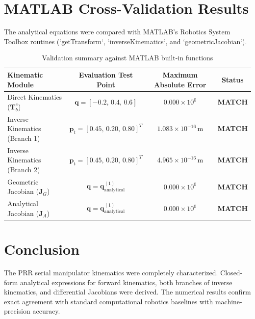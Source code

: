 \documentclass[11pt, a4paper]{article}
\begin{document}
\section{MATLAB Cross-Validation Results}
The analytical equations were compared with MATLAB's Robotics System Toolbox routines (`getTransform`, `inverseKinematics`, and `geometricJacobian`).

\begin{table}[htbp]
\centering
\caption{Validation summary against MATLAB built-in functions}
\label{tab:validation}
\begin{tabular}{lccc}
\toprule
\textbf{Kinematic Module} & \textbf{Evaluation Test Point} & \textbf{Maximum Absolute Error} & \textbf{Status} \\
\midrule
Direct Kinematics ($\mathbf{T}_b^e$) & $\mathbf{q} = [-0.2,\, 0.4,\, 0.6]$ & $0.000\times 10^0$ & \textbf{MATCH} \\
Inverse Kinematics (Branch 1) & $\mathbf{p}_t = [0.45,\, 0.20,\, 0.80]^T$ & $1.083\times 10^{-16}\,\text{m}$ & \textbf{MATCH} \\
Inverse Kinematics (Branch 2) & $\mathbf{p}_t = [0.45,\, 0.20,\, 0.80]^T$ & $4.965\times 10^{-16}\,\text{m}$ & \textbf{MATCH} \\
Geometric Jacobian ($\mathbf{J}_G$) & $\mathbf{q} = \mathbf{q}_{\text{analytical}}^{(1)}$ & $0.000\times 10^0$ & \textbf{MATCH} \\
Analytical Jacobian ($\mathbf{J}_A$) & $\mathbf{q} = \mathbf{q}_{\text{analytical}}^{(1)}$ & $0.000\times 10^0$ & \textbf{MATCH} \\
\bottomrule
\end{tabular}
\end{table}

\section{Conclusion}
The PRR serial manipulator kinematics were completely characterized. Closed-form analytical expressions for forward kinematics, both branches of inverse kinematics, and differential Jacobians were derived. The numerical results confirm exact agreement with standard computational robotics baselines with machine-precision accuracy.
\end{document}
